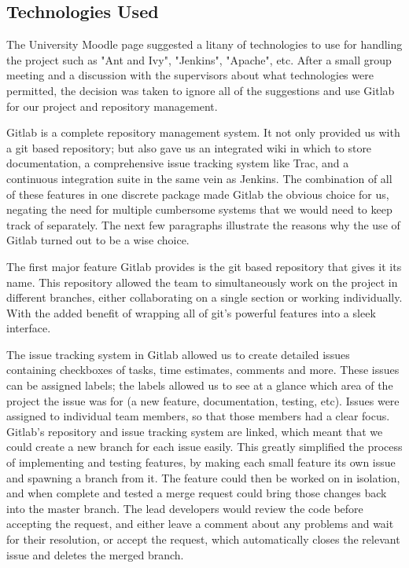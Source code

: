 \documentclass{l3proj}
\begin{document}
\subsection{Technologies Used}
\label{sec:tech}

The University Moodle page suggested a litany of technologies to use for handling the project such as "Ant and Ivy", "Jenkins", "Apache", etc. After a small group meeting and a discussion with the supervisors about what technologies were permitted, the decision was taken to ignore all of the suggestions and use Gitlab \cite{Gitlab} for our project and repository management.

Gitlab is a complete repository management system. It not only provided us with a git based repository; but also gave us an integrated wiki in which to store documentation, a comprehensive issue tracking system like Trac, and a continuous integration suite in the same vein as Jenkins. The combination of all of these features in one discrete package made Gitlab the obvious choice for us, negating the need for multiple cumbersome systems that we would need to keep track of separately. The next few paragraphs illustrate the reasons why the use of Gitlab turned out to be a wise choice.

The first major feature Gitlab provides is the git based repository that gives it its name. This repository allowed the team to simultaneously work on the project in different branches, either collaborating on a single section or working individually. With the added benefit of wrapping all of git's powerful features into a sleek interface.

The issue tracking system in Gitlab allowed us to create detailed issues containing checkboxes of tasks, time estimates, comments and more. These issues can be assigned labels; the labels allowed us to see at a glance which area of the project the issue was for (a new feature, documentation, testing, etc). Issues were assigned to individual team members, so that those members had a clear focus. Gitlab's repository and issue tracking system are linked, which meant that we could create a new branch for each issue easily. This greatly simplified the process of implementing and testing features, by making each small feature its own issue and spawning a branch from it. The feature could then be worked on in isolation, and when complete and tested a merge request could bring those changes back into the master branch. The lead developers would review the code before accepting the request, and either leave a comment about any problems and wait for their resolution, or accept the request, which automatically closes the relevant issue and deletes the merged branch.
\end{document}
